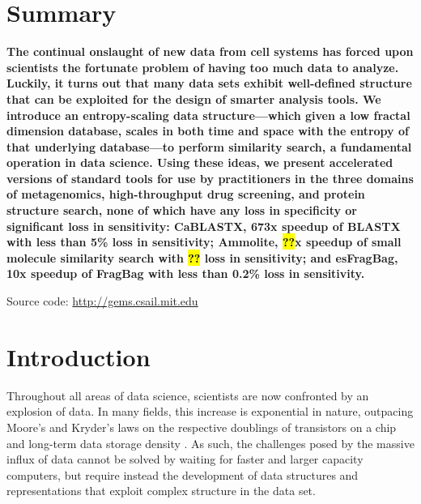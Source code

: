 \documentclass[review,preprint,12pt]{elsarticle}
\renewcommand{\cite}{\citep} %
\theoremstyle{definition}
\theoremstyle{remark}
\numberwithin{equation}{section}
\begin{document}
\section{Summary}
{ \bfseries
    The continual onslaught of new data from cell systems has forced upon scientists the fortunate problem of having too much data to analyze.
    Luckily, it turns out that many data sets exhibit well-defined structure that can be exploited for the design of 
smarter analysis tools.
    We introduce an entropy-scaling data structure---which given a low fractal dimension database, scales in both time and space with the entropy of that underlying database---to perform similarity search, a fundamental operation in data science.
    Using these ideas, we present accelerated versions of standard tools for use by practitioners in the three domains of metagenomics, high-throughput drug screening, and protein structure search, none of which have any loss in specificity or significant loss in sensitivity:
    CaBLASTX, 673x speedup of BLASTX with less than 5\% loss in sensitivity; Ammolite, \hl{??}x speedup of small molecule similarity search with \hl{??} loss in sensitivity; and esFragBag, 10x speedup of FragBag with less than 0.2\% loss in sensitivity.

    Source code: \url{http://gems.csail.mit.edu}
}

\section{Introduction}
Throughout all areas of data science, scientists are now confronted by an 
explosion of data.
In many fields, this increase is exponential in nature, outpacing Moore's and Kryder's laws on the respective doublings of transistors on a chip and long-term data storage density \cite{kahn2011future}.
As such, the challenges posed by the massive influx of data cannot be solved by waiting for faster and larger capacity computers, but require instead the development of data structures and representations that exploit complex
structure in the data set.
\end{document}
